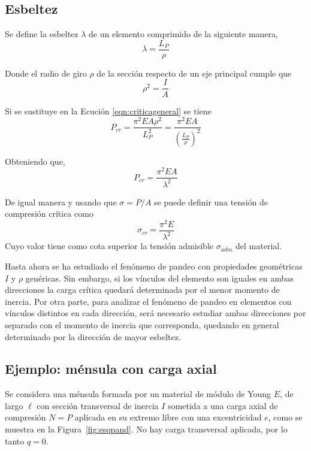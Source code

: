 \subsection{Esbeltez}

Se define la esbeltez $\lambda$ de un elemento comprimido de la siguiente manera,
\begin{equation}
\lambda = \frac{L_P}{\rho}
\end{equation}

Donde el radio de giro $\rho$ de la sección respecto de un eje principal cumple que
\begin{equation}
\rho^2 = \frac{I}{A}
\end{equation}

Si se sustituye en la Ecución \eqref{eqn:criticageneral} se tiene
$$
P_{cr} = \frac{\pi^2 E A \rho^2}{L_P^2} = \frac{\pi^2 E A}{\left(\frac{L_P}{\rho}\right)^2}
$$

Obteniendo que,
\begin{equation}
\boxed{P_{cr} = \frac{\pi^2 E A}{\lambda^2}}
\end{equation}

De igual manera y usando que $\sigma=P/A$ se puede definir una tensión de compresión crítica como  
\begin{equation}
\boxed{\sigma_{cr} = \frac{\pi^2 E}{\lambda^2}}
\end{equation}
Cuyo valor tiene como cota superior la tensión admisible $\sigma_{adm}$ del material.

Hasta ahora se ha estudiado el fenómeno de pandeo con propiedades geométricas $I$ y $\rho$ genéricas. Sin embargo, si los vínculos del elemento son iguales en ambas direcciones la carga crítica quedará determinada por el menor momento de inercia. Por otra parte, para analizar el fenómeno de pandeo en elementos con vínculos distintos en cada dirección, será necesario estudiar ambas direcciones por separado con el momento de inercia que corresponda, quedando en general determinado por la dirección de mayor esbeltez.

\subsection{Ejemplo: ménsula con carga axial}

Se considera una ménsula formada por un material de módulo de Young $E$, de largo $\ell$ con sección transversal de inercia $I$ sometida a una carga axial de compresión $N=P$ aplicada en su extremo libre con una excentricidad $e$, como se muestra en la Figura~\ref{fig:esqpand}. %
%
No hay carga transversal aplicada, por lo tanto $q=0$. %

